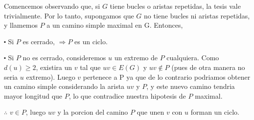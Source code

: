 \documentclass[APUNTE_COMPLEMENTOS.tex]{subfiles}
\begin{document}

{
    Comencemos observando que, si $G$ tiene bucles o aristas repetidas, la tesis vale trivialmente. Por lo tanto, supongamos que $G$ no tiene bucles ni aristas repetidas, y llamemos $P$ a un camino simple maximal en G. Entonces, 
    
    $\centerdot$ Si $P$ es cerrado, $\Longrightarrow P$ es un ciclo.
    
    $\centerdot$ Si $P$ no es cerrado, consideremos $u$ un extremo de $P$ cualquiera. Como $d(u) \geq 2$, existira un $v$ tal que $uv \in E(G)$ y $uv \notin P$ (pues de otra manera no seria $u$ extremo).
    Luego $v$ pertenece a P ya que de lo contrario podriamos obtener un camino simple considerando la arista $uv$ y $P$, y este nuevo camino tendria mayor longitud que $P$, lo que contradice nuestra hipotesis de $P$ maximal.
    
    $\therefore$ $v \in P$, luego $uv$ y la porcion del camino $P$ que unen $v$ con $u$ forman un ciclo.
}



\end{document}
